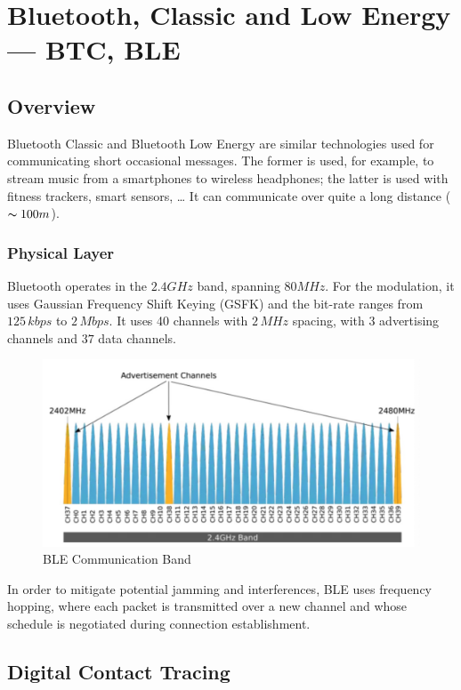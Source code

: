 \section{Bluetooth, Classic and Low Energy --- BTC, BLE}

\subsection{Overview}
Bluetooth Classic and Bluetooth Low Energy are similar technologies used for communicating short occasional messages. The former is used, for example, to stream music from a smartphones to wireless headphones; the latter is used with fitness trackers, smart sensors, \dots
It can communicate over quite a long distance ($\thicksim 100m$).
\subsubsection{Physical Layer}
Bluetooth operates in the $2.4GHz$ band, spanning $80MHz$. For the modulation, it uses Gaussian Frequency Shift Keying (GSFK) and the bit-rate ranges from $125\,{kbps}$ to $2\,Mbps$.
It uses 40 channels with $2\,MHz$ spacing, with $3$ advertising channels and $37$ data channels.

\begin{figure}[h]
	\centering
	\includegraphics[scale=0.5]{images/11-ble-comm-band.png}
	\caption{BLE Communication Band}
	\label{fig:why-tracing}
\end{figure}

In order to mitigate potential jamming and interferences, BLE uses frequency hopping, where each packet is transmitted over a new channel and whose schedule is negotiated during connection establishment.

\subsection{Digital Contact Tracing}

